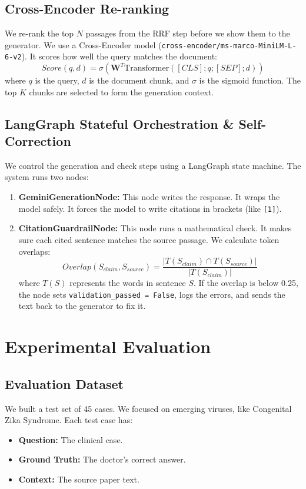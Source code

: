 \documentclass[pdflatex,sn-mathphys-num]{sn-jnl}%
\theoremstyle{thmstyleone}%
\theoremstyle{thmstyletwo}%
\theoremstyle{thmstylethree}%
\begin{document}
\subsection{Cross-Encoder Re-ranking}
We re-rank the top $N$ passages from the RRF step before we show them to the generator. We use a Cross-Encoder model (\texttt{cross-encoder/ms-marco-MiniLM-L-6-v2}). It scores how well the query matches the document:
\begin{equation}
Score(q, d) = \sigma(\mathbf{W}^T \text{Transformer}([CLS]; q; [SEP]; d))
\end{equation}
where $q$ is the query, $d$ is the document chunk, and $\sigma$ is the sigmoid function. The top $K$ chunks are selected to form the generation context.

\subsection{LangGraph Stateful Orchestration \& Self-Correction}
We control the generation and check steps using a LangGraph state machine. The system runs two nodes:
\begin{enumerate}
    \item \textbf{GeminiGenerationNode:} This node writes the response. It wraps the model safely. It forces the model to write citations in brackets (like \texttt{[1]}).
    \item \textbf{CitationGuardrailNode:} This node runs a mathematical check. It makes sure each cited sentence matches the source passage. We calculate token overlaps:
    \begin{equation}
    Overlap(S_{claim}, S_{source}) = \frac{|T(S_{claim}) \cap T(S_{source})|}{|T(S_{claim})|}
    \end{equation}
    where $T(S)$ represents the words in sentence $S$. If the overlap is below 0.25, the node sets \texttt{validation\_passed = False}, logs the errors, and sends the text back to the generator to fix it.
\end{enumerate}

\section{Experimental Evaluation}\label{sec:evaluation}

\subsection{Evaluation Dataset}
We built a test set of 45 cases. We focused on emerging viruses, like Congenital Zika Syndrome. Each test case has:
\begin{itemize}
    \item \textbf{Question:} The clinical case.
    \item \textbf{Ground Truth:} The doctor's correct answer.
    \item \textbf{Context:} The source paper text.
\end{itemize}
\end{document}

